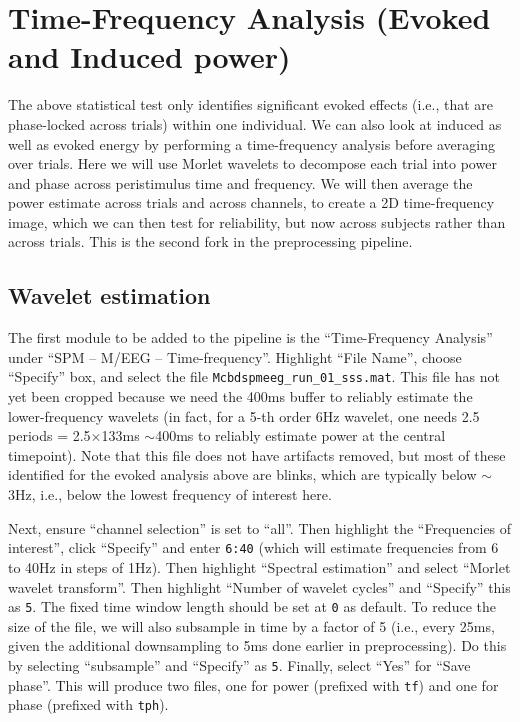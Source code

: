 \section{Time-Frequency Analysis (Evoked and Induced power)}

The above statistical test only identifies significant evoked effects (i.e., that are phase-locked across trials) within one individual. We can also look at induced as well as evoked energy by performing a time-frequency analysis before averaging over trials. Here we will use Morlet wavelets to decompose each trial into power and phase across peristimulus time and frequency. We will then average the power estimate across trials and across channels, to create a 2D time-frequency image, which we can then test for reliability, but now across subjects rather than across trials. This is the second fork in the preprocessing pipeline.

\subsection{Wavelet estimation}

The first module to be added to the pipeline is the ``Time-Frequency Analysis'' under ``SPM -- M/EEG -- Time-frequency''. Highlight ``File Name'', choose ``Specify'' box, and select the file \texttt{Mcbdspmeeg\_run\_01\_sss.mat}. This file has not yet been cropped because we need the 400ms buffer to reliably estimate the lower-frequency wavelets (in fact, for a 5-th order 6Hz wavelet, one needs 2.5 periods = 2.5\(\times\)133ms \(\sim\)400ms to reliably estimate power at the central timepoint). Note that this file does not have artifacts removed, but most of these identified for the evoked analysis above are blinks, which are typically below \(\sim\)3Hz, i.e., below the lowest frequency of interest here.

Next, ensure ``channel selection'' is set to ``all''. Then highlight the ``Frequencies of interest'', click ``Specify'' and enter \texttt{6:40} (which will estimate frequencies from 6 to 40Hz in steps of 1Hz). Then highlight ``Spectral estimation'' and select ``Morlet wavelet transform''. Then highlight ``Number of wavelet cycles'' and ``Specify'' this as \texttt{5}. The fixed time window length should be set at \texttt{0} as default. To reduce the size of the file, we will also subsample in time by a factor of 5 (i.e., every 25ms, given the additional downsampling to 5ms done earlier in preprocessing). Do this by selecting ``subsample'' and ``Specify'' as \texttt{5}. Finally, select ``Yes'' for ``Save phase''. This will produce two files, one for power (prefixed with \texttt{tf}) and one for phase (prefixed with \texttt{tph}).

